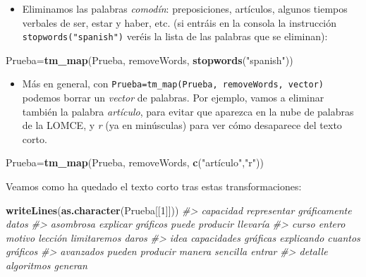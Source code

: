 \documentclass[
]{book}
\newenvironment{Shaded}{\begin{snugshade}}{\end{snugshade}}
\newcommand{\CommentTok}[1]{\textcolor[rgb]{0.56,0.35,0.01}{\textit{#1}}}
\newcommand{\DecValTok}[1]{\textcolor[rgb]{0.00,0.00,0.81}{#1}}
\newcommand{\KeywordTok}[1]{\textcolor[rgb]{0.13,0.29,0.53}{\textbf{#1}}}
\newcommand{\NormalTok}[1]{#1}
\newcommand{\StringTok}[1]{\textcolor[rgb]{0.31,0.60,0.02}{#1}}
\providecommand{\tightlist}{%
  \setlength{\itemsep}{0pt}\setlength{\parskip}{0pt}}
\theoremstyle{definition}
\theoremstyle{definition}
\theoremstyle{definition}
\theoremstyle{remark}
\begin{document}
\begin{itemize}
\tightlist
\item
  Eliminamos las palabras \emph{comodín}: preposiciones, artículos, algunos tiempos verbales de ser, estar y haber, etc. (si entráis en la consola la instrucción \texttt{stopwords("spanish")} veréis la lista de las palabras que se eliminan):
\end{itemize}

\begin{Shaded}
\begin{Highlighting}[]
\NormalTok{Prueba=}\KeywordTok{tm\_map}\NormalTok{(Prueba, removeWords, }\KeywordTok{stopwords}\NormalTok{(}\StringTok{"spanish"}\NormalTok{))}
\end{Highlighting}
\end{Shaded}

\begin{itemize}
\tightlist
\item
  Más en general, con \texttt{Prueba=tm\_map(Prueba,\ removeWords,\ vector)} podemos borrar un \emph{vector} de palabras. Por ejemplo, vamos a eliminar también la palabra \emph{artículo}, para evitar que aparezca en la nube de palabras de la LOMCE, y \emph{r} (ya en minúsculas) para ver cómo desaparece del texto corto.
\end{itemize}

\begin{Shaded}
\begin{Highlighting}[]
\NormalTok{Prueba=}\KeywordTok{tm\_map}\NormalTok{(Prueba, removeWords, }\KeywordTok{c}\NormalTok{(}\StringTok{"artículo"}\NormalTok{,}\StringTok{"r"}\NormalTok{))}
\end{Highlighting}
\end{Shaded}

Veamos como ha quedado el texto corto tras estas transformaciones:

\begin{Shaded}
\begin{Highlighting}[]
\KeywordTok{writeLines}\NormalTok{(}\KeywordTok{as.character}\NormalTok{(Prueba[[}\DecValTok{1}\NormalTok{]]))}
\CommentTok{\#\textgreater{}  capacidad     representar gráficamente datos  }
\CommentTok{\#\textgreater{} asombrosa  explicar   gráficos  puede producir   llevaría }
\CommentTok{\#\textgreater{}  curso entero   motivo    lección  limitaremos  daros }
\CommentTok{\#\textgreater{}  idea   capacidades gráficas explicando  cuantos gráficos }
\CommentTok{\#\textgreater{} avanzados   pueden  producir    manera sencilla   entrar }
\CommentTok{\#\textgreater{}   detalle   algoritmos    generan}
\end{Highlighting}
\end{Shaded}
\end{document}
